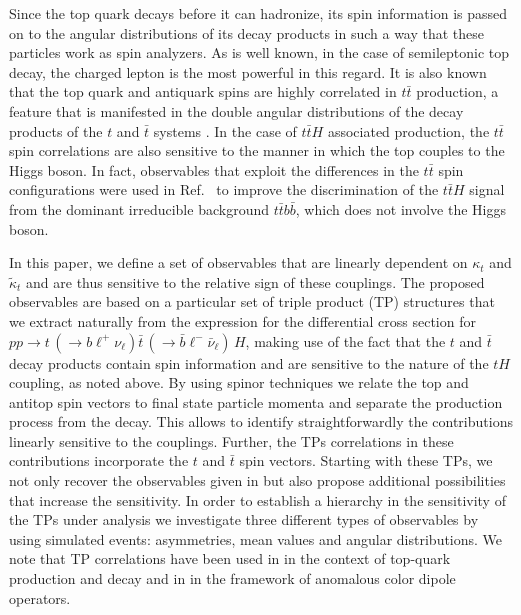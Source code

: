 \documentclass[aps,preprint,tightenlines,floatfix,superscriptaddress,nofootinbib,showpacs]{revtex4-1}
\def\tbar{\bar{t}}
\def\bbar{\bar{b}}
\def\nubar{{\bar{\nu}}_{\ell}}
\def\ppprocess{pp\to t\,\left(\rightarrow b {\ell}^+ \nu_{\ell}\right) \tbar\,\left(\rightarrow\bbar {\ell}^-\nubar\right)\,H}
\def\kp{\kappa_t}
\def\kpt{\tilde{\kappa}_t}
\begin{document}
Since the top quark decays before it can hadronize, its spin
information is passed on to the angular distributions of its decay
products in such a way that these particles work as spin analyzers.
As is well known, in the case of semileptonic top decay,
the charged lepton is the most powerful in this regard.
It is also known that the top quark and antiquark spins
are highly correlated in $t\tbar$ production,
a feature that
is manifested in the double angular distributions of the decay
products of the $t$ and $\tbar$ systems \cite{Mahlon1,*Mahlon2,*Mahlon3,*atwood}.
In the case of
$t\tbar H$ associated production, the $t\tbar$ spin correlations
are also sensitive to the manner in which
the top couples to the Higgs boson. 
In fact, observables that exploit
the differences in the $t\tbar$ spin configurations were used in
Ref.~\cite{Biswas} to improve the discrimination of the $t\tbar H$ signal
from the dominant irreducible background $t\tbar b\bbar$, which does not
involve the Higgs boson. 

In this paper, we define a set of observables that are linearly dependent on
$\kp$ and $\kpt$ and are thus sensitive to the relative sign of these
couplings. The proposed observables are based on a particular set of
triple product (TP) structures that we extract naturally from the
expression for the differential cross section for $\ppprocess$,
making use of the fact that the $t$ and $\tbar$ decay products
contain spin information and are sensitive to the
nature of the $tH$ coupling, as noted above.
By using spinor techniques we relate the top
and antitop spin vectors to final state particle
momenta and separate the production process from the decay. This
allows to identify straightforwardly the contributions linearly
sensitive to the couplings.
 Further, the TPs correlations in these
contributions incorporate the $t$ and $\tbar$ spin vectors. Starting
with these TPs, we not only recover the observables given in
\cite{Ellis,Guadagnoli} but also propose additional possibilities that
increase the sensitivity. In order to establish a hierarchy in the
sensitivity of the TPs under analysis we investigate three different
types of observables by using simulated events: asymmetries, mean
values and angular distributions. We note that TP correlations have
been used in \cite{Valencia1,*Valencia2} in the context of top-quark
production and decay and in \cite{Valencia3} in the framework of
anomalous color dipole operators.  \par
\end{document}
